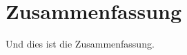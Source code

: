 \documentclass[
  11pt,
  a4paper,
  twoside,
  headsepline,
  titlepage,
  parskip=off
  DIV=11,
  BCOR=12mm,
  captions=tableheading,
  chapterprefix=on,
  numbers=noenddot
]{scrbook}
\begin{document}
\chapter*{Zusammenfassung}
Und dies ist die Zusammenfassung.
%
%
%
%
\end{document}
